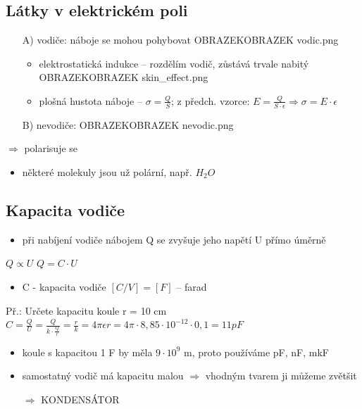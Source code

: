 \documentclass{article}
\begin{document}
\subsection{Látky v elektrickém poli}
\begin{itemize}
  \item[A)] vodiče: náboje se mohou pohybovat OBRAZEKOBRAZEK vodic.png
  \begin{itemize}
    \item elektrostatická indukce -- rozdělím vodič, zůstává trvale nabitý OBRAZEKOBRAZEK skin\_effect.png
    \item plošná hustota náboje -- $\sigma = \frac{Q}{S}$; z předch. vzorce: $E = \frac{Q}{S\cdot \epsilon} \Rightarrow \sigma = E\cdot \epsilon$
  \end{itemize}
  \item[B)] nevodiče: OBRAZEKOBRAZEK nevodic.png
\end{itemize}
$\Rightarrow$ polarisuje se
\begin{itemize}
  \begin{itemize}
    \item některé molekuly jsou už  polární, např. $H_2O$
  \end{itemize}
\end{itemize}
\subsection{Kapacita vodiče}
\begin{itemize}
  \item při nabíjení vodiče nábojem Q se zvyšuje jeho napětí U přímo úměrně
\end{itemize}
  $Q \propto U$
  $Q = C \cdot U$
\begin{itemize}
  \item C - kapacita vodiče $[C/V] = [F]$ -- farad
\end{itemize}
Př.: Určete kapacitu koule r = 10 cm
$C = \frac{Q}{U} = \frac{Q}{k\cdot \frac{Q}{r}} = \frac{r}{k} = 4\pi \epsilon r = 4\pi\cdot8,85\cdot10^{-12}\cdot0,1 = 11 pF$
\begin{itemize}
  \item koule s kapacitou 1 F by měla $9\cdot 10^{9}$ m, proto používáme pF, nF, mkF
  \item samostatný vodič má kapacitu malou $\Rightarrow$ vhodným tvarem ji můžeme zvětšit
  \item[ $\Rightarrow$ ] KONDENSÁTOR
\end{itemize}
\end{document}
